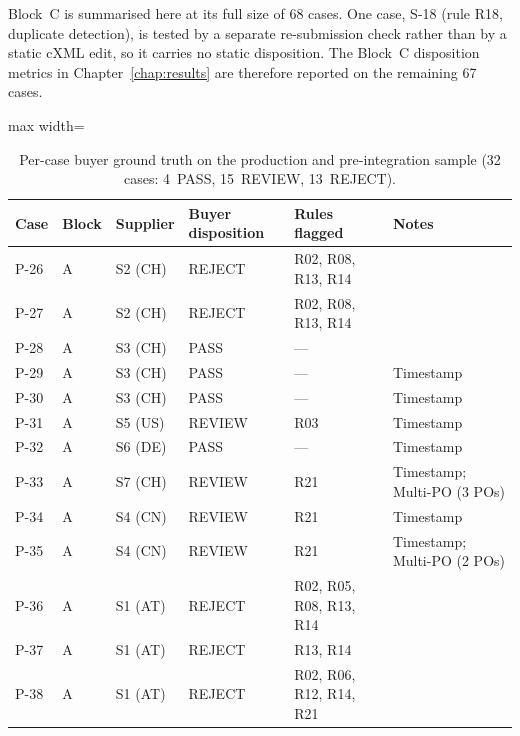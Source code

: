 Block~C is summarised here at its full size of 68 cases. One case, S-18 (rule R18, duplicate detection), is tested by a separate re-submission check rather than by a static cXML edit, so it carries no static disposition. The Block~C disposition metrics in Chapter~\ref{chap:results} are therefore reported on the remaining 67 cases.

\begin{table}[htbp]
\centering
\caption{Per-case buyer ground truth on the production and pre-integration sample (32 cases: 4~PASS, 15~REVIEW, 13~REJECT).}
\label{tab:app:percase}
\scriptsize
\begin{adjustbox}{max width=\textwidth}
\begin{tabular}{@{}lllp{2.4cm}p{5.5cm}p{3cm}@{}}
\toprule
\textbf{Case} & \textbf{Block} & \textbf{Supplier} & \textbf{Buyer disposition} & \textbf{Rules flagged} & \textbf{Notes} \\
\midrule
P-26  & A & S2 (CH)  & REJECT  & R02, R08, R13, R14                                  & \\
P-27  & A & S2 (CH)  & REJECT  & R02, R08, R13, R14                                  & \\
P-28  & A & S3 (CH)  & PASS    & ---                                                 & \\
P-29  & A & S3 (CH)  & PASS    & ---                                                 & Timestamp \\
P-30  & A & S3 (CH)  & PASS    & ---                                                 & Timestamp \\
P-31  & A & S5 (US)  & REVIEW  & R03                                                 & Timestamp \\
P-32  & A & S6 (DE)  & PASS    & ---                                                 & Timestamp \\
P-33  & A & S7 (CH)  & REVIEW  & R21 & Timestamp; Multi-PO (3 POs) \\
P-34  & A & S4 (CN)  & REVIEW  & R21                                                 & Timestamp \\
P-35  & A & S4 (CN)  & REVIEW  & R21 & Timestamp; Multi-PO (2 POs) \\
P-36  & A & S1 (AT)  & REJECT  & R02, R05, R08, R13, R14                             & \\
P-37  & A & S1 (AT)  & REJECT  & R13, R14                                            & \\
P-38  & A & S1 (AT)  & REJECT  & R02, R06, R12, R14, R21                             & \\

\end{tabular}
\end{adjustbox}
\end{table}
